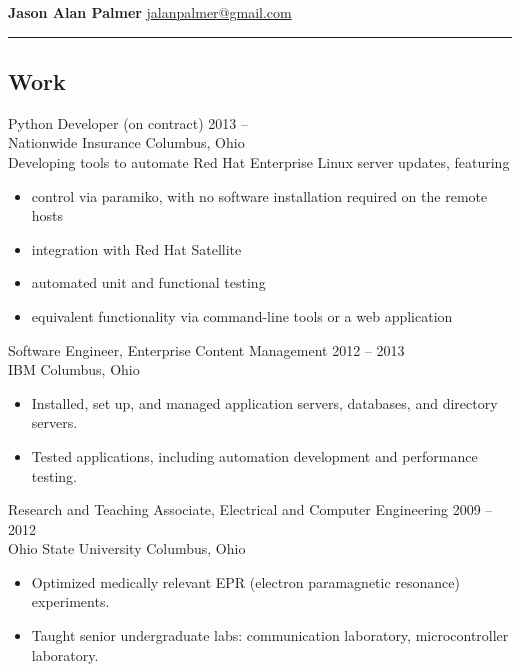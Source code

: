\documentclass[12pt]{report}
\begin{document}
\textbf{\large Jason Alan Palmer} \hfill \href{mailto:jalanpalmer@gmail.com}{jalanpalmer@gmail.com}

\rule{\textwidth}{1pt}

\subsection*{Work}

Python Developer (on contract) \hfill 2013 -- ~~~~~~ \\
Nationwide Insurance           \hfill Columbus, Ohio \\
Developing tools to automate Red Hat Enterprise Linux server updates, featuring
\begin{itemize}
\item control via paramiko, with no software installation required on the remote hosts
\item integration with Red Hat Satellite
\item automated unit and functional testing
\item equivalent functionality via command-line tools or a web application
\\
\end{itemize}

Software Engineer, Enterprise Content Management \hfill 2012 -- 2013 \\
IBM                                              \hfill Columbus, Ohio
\begin{itemize}
\item Installed, set up, and managed application servers, databases, and directory servers.
\item Tested applications, including automation development and performance testing.
\\
\end{itemize}

Research and Teaching Associate, Electrical and Computer Engineering \hfill 2009 -- 2012 \\
Ohio State University                                                \hfill Columbus, Ohio
\begin{itemize}
\item Optimized medically relevant EPR (electron paramagnetic resonance) experiments.
\item Taught senior undergraduate labs: communication laboratory, microcontroller laboratory.
\\
\end{itemize}
\end{document}
